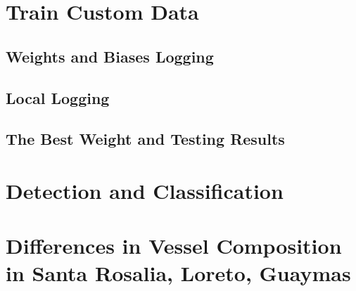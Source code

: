 
\section{Train Custom Data}
\subsection{Weights and Biases Logging}
\subsection{Local Logging}
\subsection{The Best Weight and Testing Results}

\section{Detection and Classification}

\section{Differences in Vessel Composition in Santa Rosalia, Loreto, Guaymas}